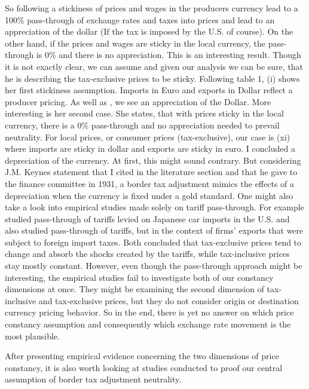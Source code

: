 So following \cite{gopinath2017macroeconomic} a stickiness of prices and wages in the producers currency lead to a 100\% pass-through of exchange rates and taxes into prices and lead to an appreciation of the dollar (If the tax is imposed by the U.S. of course). On the other hand, if the prices and wages are sticky in the local currency, the pass-through is 0\% and there is no appreciation. This is an interesting result. Though it is not exactly clear, we can assume and given our analysis we can be sure, that he is describing the tax-exclusive prices to be sticky. Following table 1, (i) shows her first stickiness assumption. Imports in Euro and exports in Dollar reflect a producer pricing. As well as \cite{gopinath2017macroeconomic}, we see an appreciation of the Dollar. More interesting is her second case. She states, that with prices sticky in the local currency, there is a 0\% pass-through and no appreciation needed to prevail neutrality. For local prices, or consumer prices (tax-exclusive), our case is (xi) where imports are sticky in dollar and exports are sticky in euro. I concluded a depreciation of the currency. At first, this might sound contrary. But considering J.M. Keynes statement that I cited in the literature section and that he gave to the finance committee in 1931, a border tax adjustment mimics the effects of a depreciation when the currency is fixed under a gold standard. One might also take a look into empirical studies made solely on tariff pass-through. For example \cite{feenstra1989symmetric} studied pass-through of tariffs levied on Japanese car imports in the U.S. and \cite{ludema2016tariff} also studied pass-through of tariffs, but in the context of firms' exports that were subject to foreign import taxes. Both concluded that tax-exclusive prices tend to change and absorb the shocks created by the tariffs, while tax-inclusive prices stay mostly constant. However, even though the pass-through approach might be interesting, the empirical studies fail to investigate both of our constancy dimensions at once. They might be examining the second dimension of tax-inclusive and tax-exclusive prices, but they do not consider origin or destination currency pricing behavior. So in the end, there is yet no answer on which price constancy assumption and consequently which exchange rate movement is the most plausible. 

After presenting empirical evidence concerning the two dimensions of price constancy, it is also worth looking at studies conducted to proof our central assumption of border tax adjustment neutrality.  

